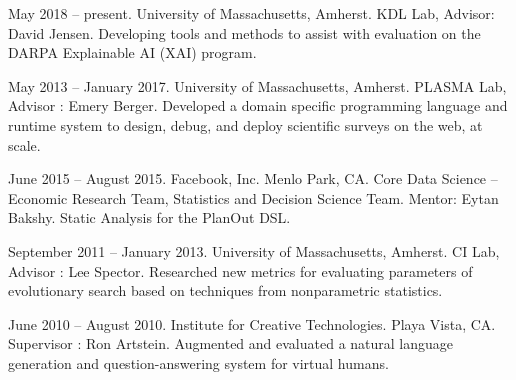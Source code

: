 \documentclass[10pt]{article}
\newcommand{\cvsec}[2]{
    \begin{tcolorbox}[width=\textwidth, breakable, title={#1}]
        #2
    \end{tcolorbox}
    \vspace{10pt}
}
\begin{document}
\cvsec{Research Experience}{
  \begin{description}[leftmargin=1cm]
  \item[Research Assistant.] May 2018 -- present. University of Massachusetts, Amherst. KDL Lab, Advisor: David Jensen. Developing tools and methods to assist with evaluation on the DARPA Explainable  AI (XAI) program.  
  \item[Research Assistant.] May 2013 -- January 2017. University of Massachusetts, Amherst. PLASMA Lab, Advisor : Emery Berger. Developed a domain specific programming language and runtime system to design, debug, and deploy scientific surveys on the web, at scale.
  \item[Research Intern.] June 2015 -- August 2015. Facebook, Inc. Menlo Park, CA. Core Data Science -- Economic Research Team, Statistics and Decision Science Team. Mentor: Eytan Bakshy. Static Analysis for the PlanOut DSL. 
  \item[Research Assistant.] September 2011 -- January 2013. University of Massachusetts, Amherst. CI Lab, Advisor : Lee Spector. Researched new metrics for evaluating parameters of evolutionary search based on techniques from nonparametric statistics.
  \item[Visiting Researcher.] June 2010 -- August 2010. Institute for Creative Technologies. Playa Vista, CA. Supervisor : Ron Artstein. Augmented and evaluated a natural language generation and question-answering system for virtual humans.
\end{description}
}
\end{document}

